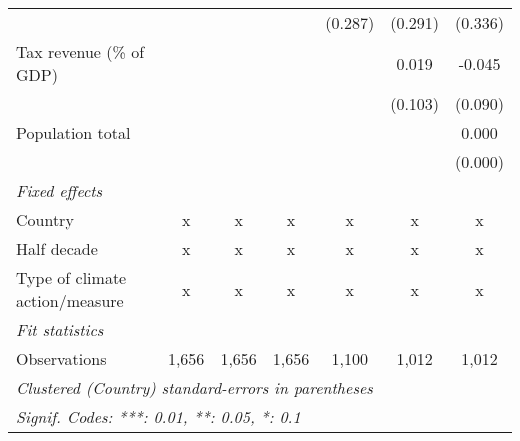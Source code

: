 \begin{tabular}{lcccccc}
                                                    &               &               &                & (0.287)        & (0.291)        & (0.336)\\   
   Tax revenue (\% of GDP)                          &               &               &                &                & 0.019          & -0.045\\   
                                                    &               &               &                &                & (0.103)        & (0.090)\\   
   Population total                                 &               &               &                &                &                & 0.000\\   
                                                    &               &               &                &                &                & (0.000)\\   
   \emph{Fixed effects}\\
   Country                                          & x             & x             & x              & x              & x              & x\\  
   Half decade                                      & x             & x             & x              & x              & x              & x\\  
   Type of climate action/measure                   & x             & x             & x              & x              & x              & x\\  
   \midrule \emph{Fit statistics}\\
   Observations                                     & 1,656         & 1,656         & 1,656          & 1,100          & 1,012          & 1,012\\  
   \midrule
   \multicolumn{7}{l}{\emph{Clustered (Country) standard-errors in parentheses}}\\
   \multicolumn{7}{l}{\emph{Signif. Codes: ***: 0.01, **: 0.05, *: 0.1}}\\
\end{tabular}
\par\endgroup


